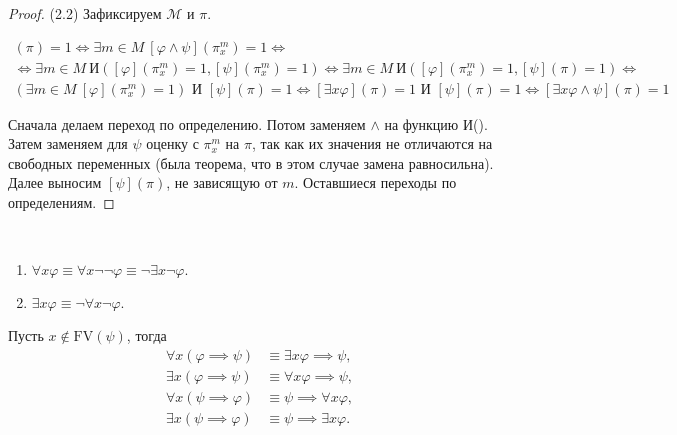 \documentclass[a4paper, fleqn]{article}
\begin{document}
    \begin{proof} {(2.2)}
        Зафиксируем $\mathcal{M}$ и $\pi$.
    

        \begin{multline}
            [\exists x (\varphi \land \psi)](\pi) = 1 \iff 
            \exists m \in M~ [\varphi \land \psi]\left(\pi_{x}^{m}\right) = 1 \iff \\
            \iff \exists m \in M~ \text{И}\left([\varphi]\left(\pi_{x}^{m}\right) = 1, [\psi]\left(\pi_{x}^{m}\right) = 1\right) \iff 
            \exists m \in M~ \text{И}\left([\varphi]\left(\pi_{x}^{m}\right) = 1, [\psi]\left(\pi\right) = 1\right) \iff \\
            \left( \exists m \in M~  [\varphi]\left(\pi_{x}^{m}\right) = 1\right) \text{ И } [\psi]\left(\pi\right) = 1 \iff
            [\exists x \varphi](\pi) = 1 \text{ И } [\psi](\pi) = 1 \iff 
            [\exists x \varphi \land \psi](\pi) = 1
        \end{multline}

        Сначала делаем переход по определению. Потом заменяем $\land$ на функцию И(). 
        Затем заменяем для $\psi$ оценку с $\pi_{x}^{m}$ на $\pi$, так как их значения не 
        отличаются на свободных переменных (была теорема, что в этом случае замена равносильна). 
        Далее выносим $[\psi]\left(\pi\right)$, не зависящую от $m$. Оставшиеся переходы 
        по определениям. 
    \end{proof}

    \begin{corollary} \
        \begin{enumerate}[topsep=0pt]
            \item $\forall x \varphi \equiv \forall x \neg \neg \varphi \equiv \neg \exists x \neg \varphi.$
            \item $\exists x \varphi \equiv \neg \forall x \neg \varphi.$
        \end{enumerate}
    \end{corollary}

    \begin{corollary}
        Пусть $x \notin \text{FV}(\psi)$, тогда
        \begin{align}
            \forall x (\varphi \implies \psi) &\equiv \exists x\varphi \implies \psi, \\
            \exists x (\varphi \implies \psi) &\equiv \forall x\varphi \implies \psi, \\
            \forall x (\psi \implies \varphi) &\equiv \psi \implies \forall x \varphi, \\
            \exists x (\psi \implies \varphi) &\equiv \psi \implies \exists x \varphi.
        \end{align}
    \end{corollary}
    
\end{document}
